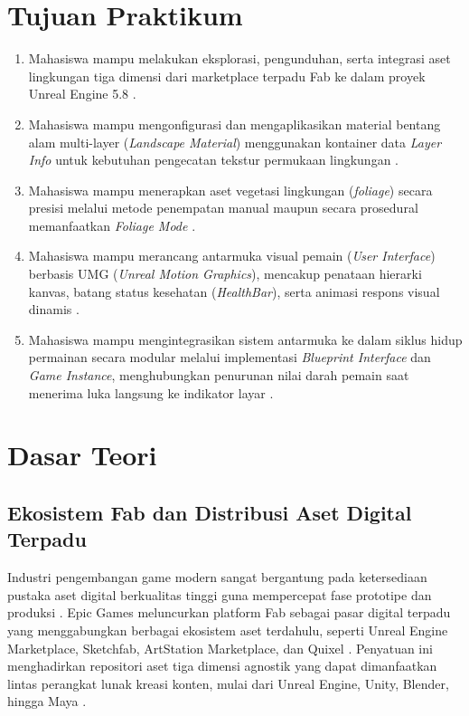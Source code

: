 \documentclass[a4paper,oneside,12pt]{report}
\begin{document}
\thispagestyle{empty}
\clearpage
{}
\thispagestyle{empty}

\tableofcontents
\clearpage

\setcounter{page}{3}

\chapter[Tujuan Praktikum]{Tujuan Praktikum}
\begin{enumerate}\setlength{\itemsep}{0.3em}\setlength{\parskip}{0pt}
	\item Mahasiswa mampu melakukan eksplorasi, pengunduhan, serta integrasi aset lingkungan tiga dimensi dari marketplace terpadu Fab ke dalam proyek Unreal Engine 5.8 \cite{modul7,fab-market}.
	\item Mahasiswa mampu mengonfigurasi dan mengaplikasikan material bentang alam multi-layer (\textit{Landscape Material}) menggunakan kontainer data \textit{Layer Info} untuk kebutuhan pengecatan tekstur permukaan lingkungan \cite{modul7,epic-landscape-materials}.
	\item Mahasiswa mampu menerapkan aset vegetasi lingkungan (\textit{foliage}) secara presisi melalui metode penempatan manual maupun secara prosedural memanfaatkan \textit{Foliage Mode} \cite{modul7,epic-foliage-mode}.
	\item Mahasiswa mampu merancang antarmuka visual pemain (\textit{User Interface}) berbasis UMG (\textit{Unreal Motion Graphics}), mencakup penataan hierarki kanvas, batang status kesehatan (\textit{HealthBar}), serta animasi respons visual dinamis \cite{modul7,epic-umg,epic-widget-animation}.
	\item Mahasiswa mampu mengintegrasikan sistem antarmuka ke dalam siklus hidup permainan secara modular melalui implementasi \textit{Blueprint Interface} dan \textit{Game Instance}, menghubungkan penurunan nilai darah pemain saat menerima luka langsung ke indikator layar \cite{modul7,epic-blueprint-interface,epic-game-instance}.
\end{enumerate}
\clearpage

\chapter{Dasar Teori}

\section{Ekosistem Fab dan Distribusi Aset Digital Terpadu}
Industri pengembangan game modern sangat bergantung pada ketersediaan pustaka aset digital berkualitas tinggi guna mempercepat fase prototipe dan produksi \cite{fab-market}. Epic Games meluncurkan platform Fab sebagai pasar digital terpadu yang menggabungkan berbagai ekosistem aset terdahulu, seperti Unreal Engine Marketplace, Sketchfab, ArtStation Marketplace, dan Quixel \cite{epic-fab-overview}. Penyatuan ini menghadirkan repositori aset tiga dimensi agnostik yang dapat dimanfaatkan lintas perangkat lunak kreasi konten, mulai dari Unreal Engine, Unity, Blender, hingga Maya \cite{fab-market}.
\end{document}
